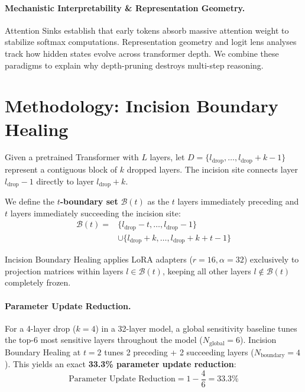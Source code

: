 \documentclass[11pt]{article}
\begin{document}
\paragraph{Mechanistic Interpretability \& Representation Geometry.}
Attention Sinks \citep{xiao2023efficient} establish that early tokens absorb massive attention weight to stabilize softmax computations. Representation geometry and logit lens analyses \citep{nostalgebraist2021lens} track how hidden states evolve across transformer depth. We combine these paradigms to explain why depth-pruning destroys multi-step reasoning.

\section{Methodology: Incision Boundary Healing}

Given a pretrained Transformer with $L$ layers, let $D = \{l_{\text{drop}}, \dots, l_{\text{drop}} + k - 1\}$ represent a contiguous block of $k$ dropped layers. The incision site connects layer $l_{\text{drop}} - 1$ directly to layer $l_{\text{drop}} + k$.

We define the \textbf{$t$-boundary set} $\mathcal{B}(t)$ as the $t$ layers immediately preceding and $t$ layers immediately succeeding the incision site:
\begin{equation}
\begin{aligned}
\mathcal{B}(t) = {}& \{l_{\text{drop}} - t, \dots, l_{\text{drop}} - 1\} \\
& \cup \{l_{\text{drop}} + k, \dots, l_{\text{drop}} + k + t - 1\}
\end{aligned}
\end{equation}

Incision Boundary Healing applies LoRA adapters ($r=16, \alpha=32$) exclusively to projection matrices within layers $l \in \mathcal{B}(t)$, keeping all other layers $l \notin \mathcal{B}(t)$ completely frozen.

\paragraph{Parameter Update Reduction.}
For a 4-layer drop ($k=4$) in a 32-layer model, a global sensitivity baseline tunes the top-6 most sensitive layers throughout the model ($N_{\text{global}} = 6$). Incision Boundary Healing at $t=2$ tunes 2 preceding + 2 succeeding layers ($N_{\text{boundary}} = 4$). This yields an exact \textbf{33.3\% parameter update reduction}:
\begin{equation}
\text{Parameter Update Reduction} = 1 - \frac{4}{6} = 33.3\%
\end{equation}
\end{document}
